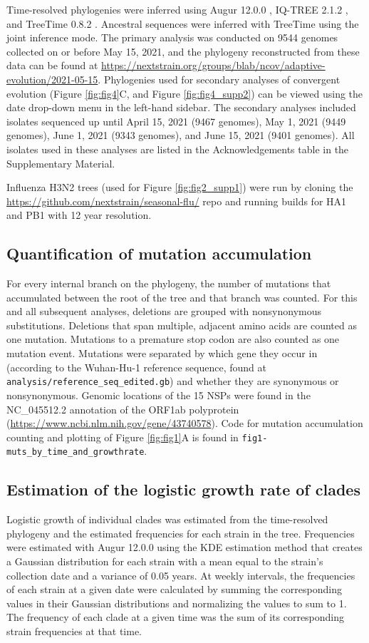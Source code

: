 \documentclass[11pt,oneside,letterpaper]{article}
\begin{document}
Time-resolved phylogenies were inferred using Augur 12.0.0 \cite{Huddleston2021-uh}, IQ-TREE 2.1.2 \cite{Nguyen2015-bp}, and TreeTime 0.8.2 \cite{Sagulenko2018-ok}. Ancestral sequences were inferred with TreeTime using the joint inference mode. The primary analysis was conducted on 9544 genomes collected on or before May 15, 2021, and the phylogeny reconstructed from these data can be found at \url{https://nextstrain.org/groups/blab/ncov/adaptive-evolution/2021-05-15}. Phylogenies used for secondary analyses of convergent evolution (Figure \ref{fig:fig4}C, and Figure \ref{fig:fig4_supp2}) can be viewed using the date drop-down menu in the left-hand sidebar. The secondary analyses included isolates sequenced up until April 15, 2021 (9467 genomes), May 1, 2021 (9449 genomes), June 1, 2021 (9343 genomes), and June 15, 2021 (9401 genomes). All isolates used in these analyses are listed in the Acknowledgements table in the Supplementary Material.

Influenza H3N2 trees (used for Figure \ref{fig:fig2_supp1}) were run by cloning the \url{https://github.com/nextstrain/seasonal-flu/} repo and running builds for HA1 and PB1 with 12 year resolution.

\subsection*{Quantification of mutation accumulation}
For every internal branch on the phylogeny, the number of mutations that accumulated between the root of the tree and that branch was counted. For this and all subsequent analyses, deletions are grouped with nonsynonymous substitutions. Deletions that span multiple, adjacent amino acids are counted as one mutation. Mutations to a premature stop codon are also counted as one mutation event. Mutations were separated by which gene they occur in (according to the Wuhan-Hu-1 reference sequence, found at \texttt{analysis/reference\_seq\_edited.gb}) and whether they are synonymous or nonsynonymous. Genomic locations of the 15 NSPs were found in the NC\_045512.2 annotation of the ORF1ab polyprotein (\url{https://www.ncbi.nlm.nih.gov/gene/43740578}). Code for mutation accumulation counting and plotting of Figure \ref{fig:fig1}A is found in \texttt{fig1-muts\_by\_time\_and\_growthrate}.

\subsection*{Estimation of the logistic growth rate of clades}
Logistic growth of individual clades was estimated from the time-resolved phylogeny and the estimated frequencies for each strain in the tree. Frequencies were estimated with Augur 12.0.0 \cite{Huddleston2021-uh} using the KDE estimation method that creates a Gaussian distribution for each strain with a mean equal to the strain’s collection date and a variance of 0.05 years. At weekly intervals, the frequencies of each strain at a given date were calculated by summing the corresponding values in their Gaussian distributions and normalizing the values to sum to 1. The frequency of each clade at a given time was the sum of its corresponding strain frequencies at that time.
\end{document}
